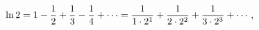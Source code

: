 \[\mathop{\ln\/}\nolimits 2=1-\frac{1}{2}+\frac{1}{3}-\frac{1}{4}+\cdots=\frac{1%
}{1\cdot 2^{1}}+\frac{1}{2\cdot 2^{2}}+\frac{1}{3\cdot 2^{3}}+\cdots,\]